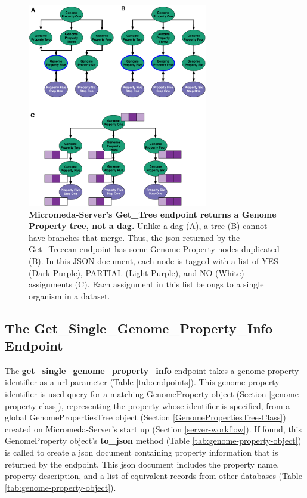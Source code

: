 \begin{figure}[!ht]
  \centering
	\includegraphics[width=0.70\textwidth]{media/Tree-JSON.pdf}
	 \caption[Micromeda-Server's Get\_Tree endpoint returns a Genome Property tree, 
not a DAG.]{\textbf{Micromeda-Server's Get\_Tree endpoint returns a Genome 
Property tree, not a \gls{dag}.} Unlike a \gls{dag} (A), a tree (B) cannot have 
branches that merge. Thus, the \gls{json} returned by the Get\_Treecan endpoint 
has some Genome Property nodes duplicated (B). In this JSON document, each node 
is tagged with a list of YES (Dark Purple), PARTIAL (Light Purple), and NO 
(White) assignments (C). Each assignment in this list belongs to a single 
organism in a dataset.}
	 \label{fig:tree-json}
\end{figure}

\subsection{The Get\_Single\_Genome\_Property\_Info Endpoint} 
\label{get-property-info-endpoint}

The \textbf{get\_single\_genome\_property\_info} endpoint takes a genome 
property identifier as a \gls{url} parameter (Table \ref{tab:endpoints}). This 
genome property identifier is used query for a matching GenomeProperty object 
(Section \ref{genome-property-class}), representing the property whose 
identifier is specified, from a global GenomePropertiesTree object (Section 
\ref{GenomePropertiesTree-Class}) created on Micromeda-Server's start up 
(Section \ref{server-workflow}). If found, this GenomeProperty object's 
\textbf{to\_json} method (Table \ref{tab:genome-property-object}) is called to 
create a \gls{json} document containing property information that is returned by 
the endpoint. This \gls{json} document includes the property name, property 
description, and a list of equivalent records from other databases (Table 
\ref{tab:genome-property-object}).

